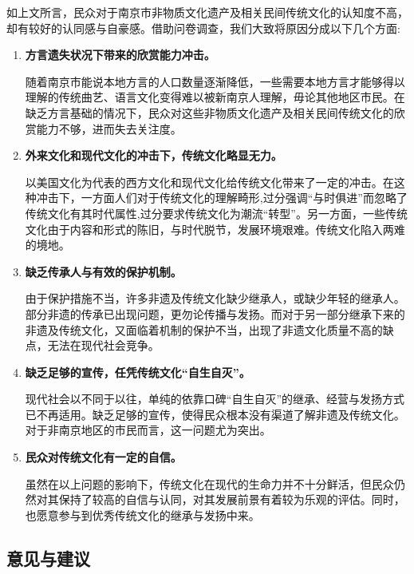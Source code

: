 \documentclass[12pt]{article}%
\begin{document}
如上文所言，民众对于南京市非物质文化遗产及相关民间传统文化的认知度不高，却有较好的认同感与自豪感。借助问卷调查，我们大致将原因分成以下几个方面:
\begin{enumerate}
  \item \textbf{方言遗失状况下带来的欣赏能力冲击。}

  随着南京市能说本地方言的人口数量逐渐降低，一些需要本地方言才能够得以理解的传统曲艺、语言文化变得难以被新南京人理解，毋论其他地区市民。在缺乏方言基础的情况下，民众对这些非物质文化遗产及相关民间传统文化的欣赏能力不够，进而失去关注度。
  \item \textbf{外来文化和现代文化的冲击下，传统文化略显无力。}

  以美国文化为代表的西方文化和现代文化给传统文化带来了一定的冲击。在这种冲击下，一方面人们对于传统文化的理解畸形,过分强调“与时俱进”而忽略了传统文化有其时代属性,过分要求传统文化为潮流“转型”。另一方面，一些传统文化由于内容和形式的陈旧，与时代脱节，发展环境艰难。传统文化陷入两难的境地。

  \item \textbf{缺乏传承人与有效的保护机制。}

  由于保护措施不当，许多非遗及传统文化缺少继承人，或缺少年轻的继承人。部分非遗的传承已出现问题，更勿论传播与发扬。而对于另一部分继承下来的非遗及传统文化，又面临着机制的保护不当，出现了非遗文化质量不高的缺点，无法在现代社会竞争。

  \item \textbf{缺乏足够的宣传，任凭传统文化“自生自灭”。}

  现代社会以不同于以往，单纯的依靠口碑“自生自灭”的继承、经营与发扬方式已不再适用。缺乏足够的宣传，使得民众根本没有渠道了解非遗及传统文化。对于非南京地区的市民而言，这一问题尤为突出。

  \item \textbf{民众对传统文化有一定的自信。}

  虽然在以上问题的影响下，传统文化在现代的生命力并不十分鲜活，但民众仍然对其保持了较高的自信与认同，对其发展前景有着较为乐观的评估。同时，也愿意参与到优秀传统文化的继承与发扬中来。

\end{enumerate}



\subsection{意见与建议}
\end{document}
